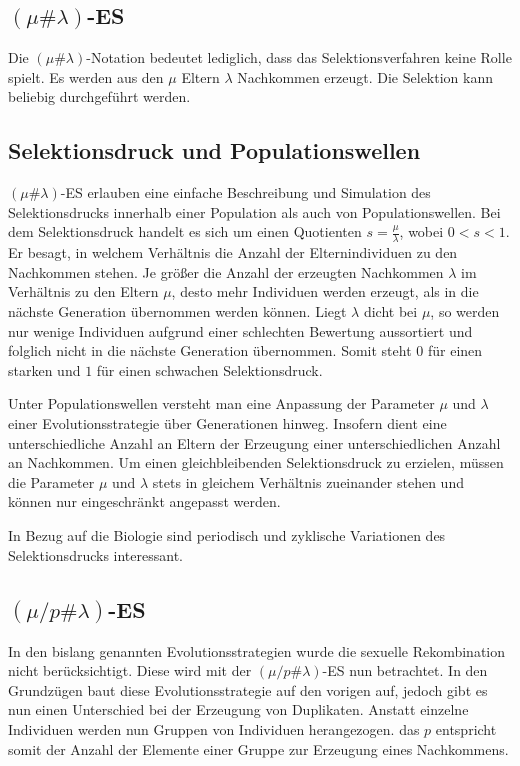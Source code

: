 \subsection{$(\mu \# \lambda)$-ES}

Die $(\mu \# \lambda)$-Notation bedeutet lediglich, dass das Selektionsverfahren keine Rolle spielt.
Es werden aus den $\mu$ Eltern $\lambda$ Nachkommen erzeugt. Die Selektion kann beliebig durchgeführt werden.

\subsection{Selektionsdruck und Populationswellen}

$(\mu \# \lambda)$-ES erlauben eine einfache Beschreibung und Simulation des Selektionsdrucks innerhalb einer Population als auch von Populationswellen.
Bei dem Selektionsdruck handelt es sich um einen Quotienten $s = \frac{\mu}{\lambda}$, wobei $0 < s < 1$.
Er besagt, in welchem Verhältnis die Anzahl der Elternindividuen zu den Nachkommen stehen.
Je größer die Anzahl der erzeugten Nachkommen $\lambda$ im Verhältnis zu den Eltern $\mu$, desto mehr Individuen werden erzeugt, als in die nächste Generation übernommen werden können.
Liegt $\lambda$ dicht bei $\mu$, so werden nur wenige Individuen aufgrund einer schlechten Bewertung aussortiert und folglich nicht in die nächste Generation übernommen.
Somit steht $0$ für einen starken und $1$ für einen schwachen Selektionsdruck.

Unter Populationswellen versteht man eine Anpassung der Parameter $\mu$ und $\lambda$ einer Evolutionsstrategie über Generationen hinweg. Insofern dient eine unterschiedliche Anzahl an Eltern der Erzeugung einer unterschiedlichen Anzahl an Nachkommen.
Um einen gleichbleibenden Selektionsdruck zu erzielen, müssen die Parameter $\mu$ und $\lambda$ stets in gleichem Verhältnis zueinander stehen und können nur eingeschränkt angepasst werden.

In Bezug auf die Biologie sind periodisch und zyklische Variationen des Selektionsdrucks interessant.

\subsection{$(\mu / p \# \lambda)$-ES}

In den bislang genannten Evolutionsstrategien wurde die sexuelle Rekombination nicht berücksichtigt.
Diese wird mit der $(\mu / p \# \lambda)$-ES nun betrachtet.
In den Grundzügen baut diese Evolutionsstrategie auf den vorigen auf, jedoch gibt es nun einen Unterschied bei der Erzeugung von Duplikaten.
Anstatt einzelne Individuen werden nun Gruppen von Individuen herangezogen.
das $p$ entspricht somit der Anzahl der Elemente einer Gruppe zur Erzeugung eines Nachkommens.

